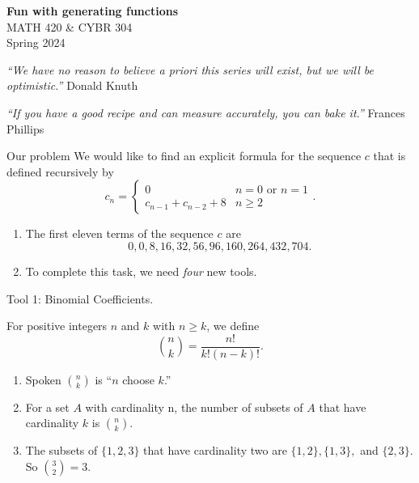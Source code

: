 \documentclass[portrait,fleqn,12pt]{beamer}
\newenvironment{handlist}
   {\begin{enumerate}[\faHandPointRight]
       \addtolength{\itemsep}{0.0\itemsep}}
     {\end{enumerate}}
\begin{document}
\begin{frame}
\begin{flushleft} 
\textbf{Fun with generating functions} \\
MATH 420 \& CYBR 304 \\
Spring 2024 
\end{flushleft}


\emph{“We have no reason to believe a priori this series will exist, but we will be optimistic.”} \hfill{\sc Donald Knuth}

\emph{“If you have a good recipe and can measure accurately, you can bake it.”} \hfill{\sc Frances Phillips}
\end{frame}


\begin{frame}[fragile]{Our problem}
We would like to find an explicit formula for the sequence $c$ that is defined recursively by
\begin{equation}
  c_n= \begin{cases} 0 & n =0 \text{ or } n =1 \\
                                 c_{n-1} + c_{n-2}+ 8 & n \geq 2
           \end{cases}.
\end{equation}
\begin{handlist}
\item The first eleven terms of the sequence $c$ are
\begin{equation}
      0,0,8,16,32,56,96,160,264,432,704.
\end{equation}
\item To complete this task, we need \emph{four} new tools.
\end{handlist}
\end{frame}
\begin{frame}{Tool 1:  Binomial Coefficients.}

For positive integers $n$ and $k$ with $n \geq k$, we define
\begin{equation}
      \binom{n}{k} = \frac{n!}{k! (n-k)!}.
\end{equation}
\begin{handlist}
 \item Spoken $\binom{n}{k}$ is ``$n$ choose $k$.''
 \item For a set $A$ with cardinality n,  the number of subsets of $A$ that have cardinality $k$ is $\binom{n}{k}$.
 \item The subsets of  $\{1,2,3\}$ that have cardinality two are $\{1,2\},\{1,3\},$ and $\{2,3\}$.  So  $\binom{3}{2} = 3$.
\end{handlist}
\end{frame}
\end{document}
